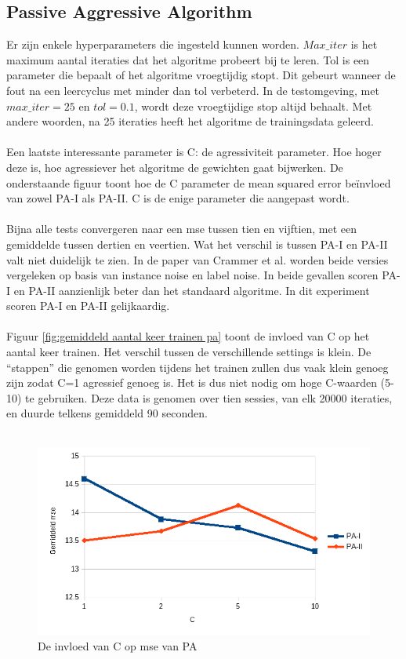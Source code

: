 \subsection{Passive Aggressive Algorithm}
Er zijn enkele hyperparameters die ingesteld kunnen worden. $Max\_ iter$ is het maximum aantal iteraties dat het algoritme probeert bij te leren. Tol is een parameter die bepaalt of het algoritme vroegtijdig stopt. Dit gebeurt wanneer de fout na een leercyclus met minder dan tol verbeterd. In de testomgeving, met $max\_ iter=25$ en $tol=0.1$, wordt deze vroegtijdige stop altijd behaalt. Met andere woorden, na 25 iteraties heeft het algoritme de trainingsdata geleerd.
\\\\
Een laatste interessante parameter is C: de agressiviteit parameter. Hoe hoger deze is, hoe agressiever het algoritme de gewichten gaat bijwerken. De onderstaande figuur toont hoe de C parameter de mean squared error beïnvloed van zowel PA-I als PA-II. C is de enige parameter die aangepast wordt.
\\\\
Bijna alle tests convergeren naar een mse tussen tien en vijftien, met een gemiddelde tussen dertien en veertien. Wat het verschil is tussen PA-I en PA-II valt niet duidelijk te zien. In de paper van Crammer et al. \cite{pa algorithm} worden beide versies vergeleken op basis van instance noise en label noise. In beide gevallen scoren PA-I en PA-II aanzienlijk beter dan het standaard algoritme. In dit experiment scoren PA-I en PA-II gelijkaardig.
\\\\
Figuur \ref{fig:gemiddeld aantal keer trainen pa} toont de invloed van C op het aantal keer trainen. Het verschil tussen de verschillende settings is klein. De “stappen” die genomen worden tijdens het trainen zullen dus vaak klein genoeg zijn zodat C=1 agressief genoeg is. Het is dus niet nodig om hoge C-waarden (5-10) te gebruiken. Deze data is genomen over tien sessies, van elk 20000 iteraties, en duurde telkens gemiddeld 90 seconden. 
\\\\
\begin{figure}[h]
	\includegraphics[width=\linewidth]{images/evaluatie/gemiddeldmsepa.png}
	\caption{De invloed van C op mse van PA}
	\label{fig:invloed C op PA}
\end{figure}
